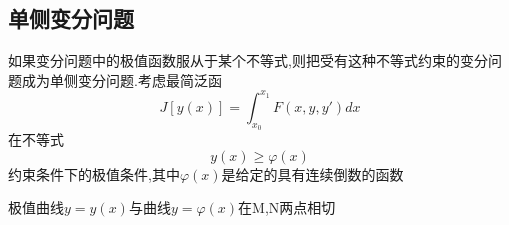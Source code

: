 \subsection{单侧变分问题}
如果变分问题中的极值函数服从于某个不等式,则把受有这种不等式约束的变分问题成为单侧变分问题.考虑最简泛函
\begin{equation}
 J[y(x)]=\int_{x_0}^{x_1}F(x,y,y')dx
\end{equation}
在不等式
\begin{equation}
 y(x) \geqslant \varphi(x)
\end{equation}
约束条件下的极值条件,其中$\varphi(x)$是给定的具有连续倒数的函数
\begin{theorem}
 极值曲线$y=y(x)$与曲线$y=\varphi(x)$在M,N两点相切
\end{theorem}
